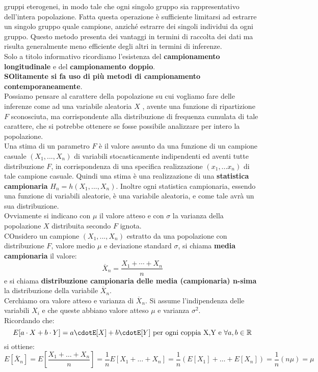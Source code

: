 \documentclass[a4paper,12pt, oneside]{book}
\newcommand{\numberset}{\mathbb}
\newcommand{\R}{\numberset{R}}
\begin{document}
gruppi eterogenei, in modo tale che ogni singolo gruppo sia rappresentativo
dell’intera popolazione. Fatta questa operazione è sufficiente limitarsi ad estrarre un singolo gruppo quale
campione, anziché estrarre dei singoli individui da ogni gruppo.
Questo metodo presenta dei vantaggi in termini di raccolta dei dati ma risulta
generalmente meno efficiente degli altri in termini di inferenze.\\
Solo a titolo informativo ricordiamo l'esistenza del \textbf{campionamento longitudinale} e del \textbf{campionamento doppio}. \\
\textbf{SOlitamente si fa uso di più metodi di campionamento contemporaneamente}.\\
Possiamo pensare al carattere della popolazione su cui vogliamo fare delle inferenze come ad una variabile aleatoria $X$ ,
avente una funzione di ripartizione $F$ sconosciuta, ma corrispondente alla
distribuzione di frequenza cumulata di tale carattere, che si potrebbe ottenere se
fosse possibile analizzare per intero la popolazione.\\
Una stima di un parametro $F$ è il valore assunto da una funzione di un campione
casuale $(X_1,...,X_n)$ di variabili stocasticamente indipendenti ed aventi tutte distribuzione $F$, in corrispondenza di una specifica realizzazione $(x_1,...x_n)$ di tale campione casuale. Quindi una stima è una realizzazione di una \textbf{statistica campionaria} $H_n=h(X_1,...,X_n)$. Inoltre ogni statistica campionaria, essendo una funzione di variabili aleatorie, è una
variabile aleatoria, e come tale avrà un sua distribuzione.\\
Ovviamente si indicano con $\mu$ il valore atteso e con $\sigma$ la varianza della popolazione $X$ distribuita secondo $F$ ignota.\\
COnsidero un campione $(X_1,...,X_n)$ estratto da una popolazione con distribuzione $F$, valore medio $\mu$ e deviazione standard $\sigma$, si chiama \textbf{media campionaria}
il valore:
\[\overline{X}_n=\frac{X_1+\cdots+X_n}{n}\]
e si chiama \textbf{distribuzione campionaria delle media (campionaria) n-sima} la distribuzione della variabile $\overline{X}_n$.\\
Cerchiamo ora valore atteso e varianza di $\overline{X}_n$. Si assume l'indipendenza delle variabili $X_i$ e che queste abbiano valore atteso $\mu$ e varianza $\sigma^2$.\\
Ricordando che:
\[E[a\cdot X+b\cdot Y]=a\cdotE[X]+b\cdotE[Y]\mbox{ per ogni coppia X,Y e }\forall a,b\in \R\]
si ottiene:
\[E\left[\overline{X}_{n}\right]=E\left[\frac{X_{1}+\ldots+X_{n}}{n}\right]=\frac{1}{n} E\left[X_{1}+\ldots+X_{n}\right]=\frac{1}{n}\left(E\left[X_{1}\right]+\ldots+E\left[X_{n}\right]\right)=\frac{1}{n}(n \mu)=\mu\]
\end{document}
